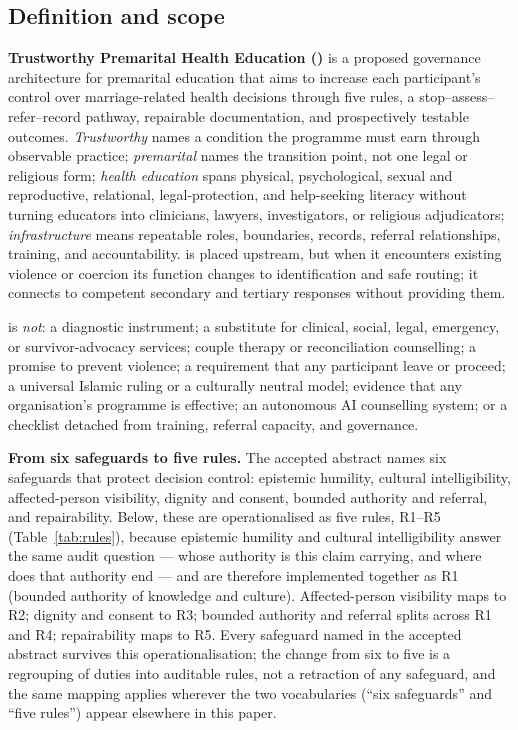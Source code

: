 
\subsection{Definition and scope}
\textbf{Trustworthy Premarital Health Education (\tphe)} is a proposed governance architecture for
premarital education that aims to increase each participant's control over marriage-related health
decisions through five rules, a stop--assess--refer--record pathway, repairable documentation, and
prospectively testable outcomes. \emph{Trustworthy} names a condition the programme must earn through
observable practice; \emph{premarital} names the transition point, not one legal or religious form;
\emph{health education} spans physical, psychological, sexual and reproductive, relational,
legal-protection, and help-seeking literacy without turning educators into clinicians, lawyers,
investigators, or religious adjudicators; \emph{infrastructure} means repeatable roles, boundaries,
records, referral relationships, training, and accountability. \tphe{} is placed upstream, but when it
encounters existing violence or coercion its function changes to identification and safe routing; it
connects to competent secondary and tertiary responses without providing them.

\tphe{} is \emph{not}: a diagnostic instrument; a substitute for clinical, social, legal, emergency, or
survivor-advocacy services; couple therapy or reconciliation counselling; a promise to prevent
violence; a requirement that any participant leave or proceed; a universal Islamic ruling or a
culturally neutral model; evidence that any organisation's programme is effective; an autonomous AI
counselling system; or a checklist detached from training, referral capacity, and governance.

\textbf{From six safeguards to five rules.} The accepted abstract names six safeguards that protect
decision control: epistemic humility, cultural intelligibility, affected-person visibility, dignity
and consent, bounded authority and referral, and repairability. Below, these are operationalised as
five rules, R1--R5 (Table~\ref{tab:rules}), because epistemic humility and cultural intelligibility
answer the same audit question --- whose authority is this claim carrying, and where does that
authority end --- and are therefore implemented together as R1 (bounded authority of knowledge and
culture). Affected-person visibility maps to R2; dignity and consent to R3; bounded authority and
referral splits across R1 and R4; repairability maps to R5. Every safeguard named in the accepted
abstract survives this operationalisation; the change from six to five is a regrouping of duties into
auditable rules, not a retraction of any safeguard, and the same mapping applies wherever the two
vocabularies (``six safeguards'' and ``five rules'') appear elsewhere in this paper.

